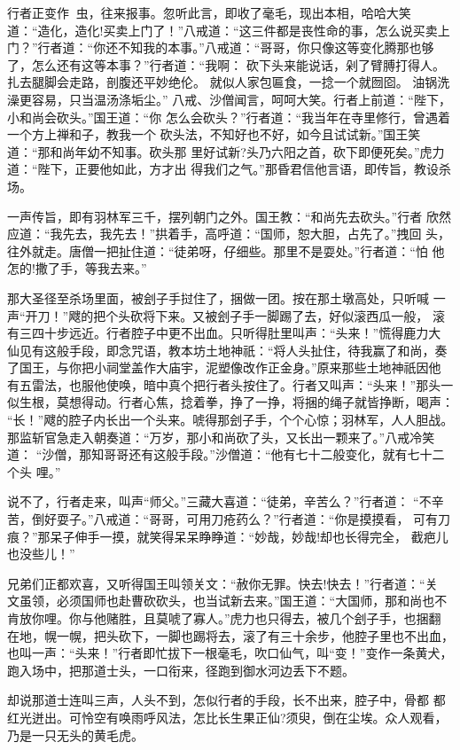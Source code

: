 行者正变作虫，往来报事。忽听此言，即收了毫毛，现出本相，哈哈大笑
道：“造化，造化!买卖上门了！”八戒道：“这三件都是丧性命的事，怎么说买卖上
门？”行者道：“你还不知我的本事。”八戒道：“哥哥，你只像这等变化腾那也够
了，怎么还有这等本事？”行者道：“我啊：
砍下头来能说话，剁了臂膊打得人。
扎去腿脚会走路，剖腹还平妙绝伦。
就似人家包匾食，一捻一个就囫囵。
油锅洗澡更容易，只当温汤涤垢尘。”
八戒、沙僧闻言，呵呵大笑。行者上前道：“陛下，小和尚会砍头。”国王道：“你
怎么会砍头？”行者道：“我当年在寺里修行，曾遇着一个方上禅和子，教我一个
砍头法，不知好也不好，如今且试试新。”国王笑道：“那和尚年幼不知事。砍头那
里好试新?头乃六阳之首，砍下即便死矣。”虎力道：“陛下，正要他如此，方才出
得我们之气。”那昏君信他言语，即传旨，教设杀场。

一声传旨，即有羽林军三千，摆列朝门之外。国王教：“和尚先去砍头。”行者
欣然应道：“我先去，我先去！”拱着手，高呼道：“国师，恕大胆，占先了。”拽回
头，往外就走。唐僧一把扯住道：“徒弟呀，仔细些。那里不是耍处。”行者道：“怕
他怎的!撒了手，等我去来。”

那大圣径至杀场里面，被刽子手挝住了，捆做一团。按在那土墩高处，只听喊
一声“开刀！”飕的把个头砍将下来。又被刽子手一脚踢了去，好似滚西瓜一般，
滚有三四十步远近。行者腔子中更不出血。只听得肚里叫声：“头来！”慌得鹿力大
仙见有这般手段，即念咒语，教本坊土地神祇：“将人头扯住，待我赢了和尚，奏
了国王，与你把小祠堂盖作大庙宇，泥塑像改作正金身。”原来那些土地神祇因他
有五雷法，也服他使唤，暗中真个把行者头按住了。行者又叫声：“头来！”那头一
似生根，莫想得动。行者心焦，捻着拳，挣了一挣，将捆的绳子就皆挣断，喝声：
“长！”飕的腔子内长出一个头来。唬得那刽子手，个个心惊；羽林军，人人胆战。
那监斩官急走入朝奏道：“万岁，那小和尚砍了头，又长出一颗来了。”八戒冷笑道：
“沙僧，那知哥哥还有这般手段。”沙僧道：“他有七十二般变化，就有七十二个头
哩。”

说不了，行者走来，叫声“师父。”三藏大喜道：“徒弟，辛苦么？”行者道：
“不辛苦，倒好耍子。”八戒道：“哥哥，可用刀疮药么？”行者道：“你是摸摸看，
可有刀痕？”那呆子伸手一摸，就笑得呆呆睁睁道：“妙哉，妙哉!却也长得完全，
截疤儿也没些儿！”

兄弟们正都欢喜，又听得国王叫领关文：“赦你无罪。快去!快去！”行者道：“关
文虽领，必须国师也赴曹砍砍头，也当试新去来。”国王道：“大国师，那和尚也不
肯放你哩。你与他赌胜，且莫唬了寡人。”虎力也只得去，被几个刽子手，也捆翻
在地，幌一幌，把头砍下，一脚也踢将去，滚了有三十余步，他腔子里也不出血，
也叫一声：“头来！”行者即忙拔下一根毫毛，吹口仙气，叫“变！”变作一条黄犬，
跑入场中，把那道士头，一口衔来，径跑到御水河边丢下不题。

却说那道士连叫三声，人头不到，怎似行者的手段，长不出来，腔子中，骨都
都红光迸出。可怜空有唤雨呼风法，怎比长生果正仙?须臾，倒在尘埃。众人观看，
乃是一只无头的黄毛虎。

